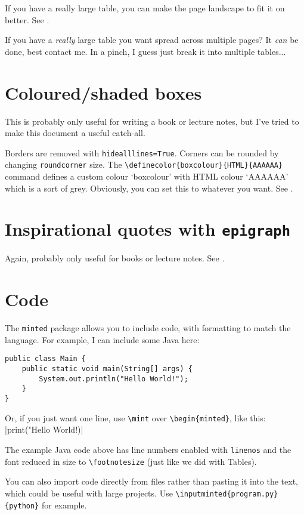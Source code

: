 \documentclass[../main]{subfiles}
\begin{document}
If you have a really large table, you can make the page landscape to fit it on better. See .

If you have a \textit{really} large table you want spread across multiple pages? It \textit{can} be done, best contact me. In a pinch, I guess just break it into multiple tables...

\section{Coloured/shaded boxes}

This is probably only useful for writing a book or lecture notes, but I've tried to make this document a useful catch-all.

Borders are removed with \texttt{hidealllines=True}. Corners can be rounded by changing \texttt{roundcorner} size. The \verb|\definecolor{boxcolour}{HTML}{AAAAAA}| command defines a custom colour `boxcolour' with HTML colour `AAAAAA' which is a sort of grey. Obviously, you can set this to whatever you want. See .

\section{Inspirational quotes with \texttt{epigraph}}

Again, probably only useful for books or lecture notes. See .

\section{Code}
The \texttt{minted} package allows you to include code, with formatting to match the language. For example, I can include some Java here:

\begin{verbatim}
public class Main {
    public static void main(String[] args) {
        System.out.println("Hello World!");
    }
}
\end{verbatim}

Or, if you just want one line, use \verb|\mint| over \verb|\begin{minted}|, like this: |print("Hello World!)|

The example Java code above has line numbers enabled with \texttt{linenos} and the font reduced in size to \verb|\footnotesize| (just like we did with Tables).

You can also import code directly from files rather than pasting it into the text, which could be useful with large projects. Use \verb|\inputminted{program.py}{python}| for example.
\end{document}
